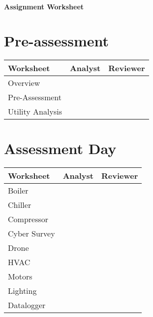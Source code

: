 \documentclass[./main.tex]{subfiles}
\begin{document}
\begin{center}
\Large\textbf{Assignment Worksheet}
\end{center}

\renewcommand{\arraystretch}{2} %

\section*{Pre-assessment}


\begin{tabular}{|p{5cm}|p{5cm}|p{5cm}|}
\hline
\textbf{Worksheet} & \textbf{Analyst} & \textbf{Reviewer} \\
\hline
Overview & & \\ \hline
Pre-Assessment & & \\ \hline
Utility Analysis & & \\ \hline
\end{tabular}

\section*{Assessment Day}

\begin{tabular}{|p{5cm}|p{5cm}|p{5cm}|}
\hline
\textbf{Worksheet} & \textbf{Analyst} & \textbf{Reviewer} \\
\hline
Boiler & & \\ \hline
Chiller & & \\ \hline
Compressor & & \\ \hline
Cyber Survey & & \\ \hline
Drone & & \\ \hline
HVAC & & \\ \hline
Motors & & \\ \hline
Lighting & & \\ \hline
Datalogger & & \\ \hline
\end{tabular}


\end{document}
